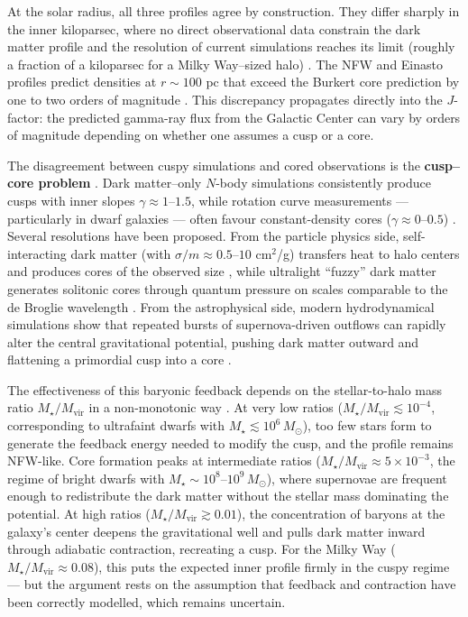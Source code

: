 At the solar radius, all three profiles agree by construction.
They differ sharply in the inner kiloparsec, where no direct observational data constrain the dark matter profile and the resolution of current simulations reaches its limit (roughly a fraction of a kiloparsec for a Milky Way--sized halo) \cite{Cirelli:2024ssz}.
The NFW and Einasto profiles predict densities at $r \sim 100$ pc that exceed the Burkert core prediction by one to two orders of magnitude \cite{Cirelli:2024ssz}.
This discrepancy propagates directly into the $J$-factor: the predicted gamma-ray flux from the Galactic Center can vary by orders of magnitude depending on whether one assumes a cusp or a core.

The disagreement between cuspy simulations and cored observations is the \textbf{cusp--core problem} \cite{Cirelli:2024ssz,Bullock:2017xww}.
Dark matter--only $N$-body simulations consistently produce cusps with inner slopes $\gamma \approx 1$--$1.5$, while rotation curve measurements --- particularly in dwarf galaxies --- often favour constant-density cores ($\gamma \approx 0$--$0.5$) \cite{Bullock:2017xww}.
Several resolutions have been proposed.
From the particle physics side, self-interacting dark matter (with $\sigma/m \approx 0.5$--$10$ cm$^2$/g) transfers heat to halo centers and produces cores of the observed size \cite{Cirelli:2024ssz,Bullock:2017xww}, while ultralight ``fuzzy'' dark matter generates solitonic cores through quantum pressure on scales comparable to the de Broglie wavelength \cite{Cirelli:2024ssz}.
From the astrophysical side, modern hydrodynamical simulations show that repeated bursts of supernova-driven outflows can rapidly alter the central gravitational potential, pushing dark matter outward and flattening a primordial cusp into a core \cite{Cirelli:2024ssz,Bullock:2017xww}.

The effectiveness of this baryonic feedback depends on the stellar-to-halo mass ratio $M_\star / M_\text{vir}$ in a non-monotonic way \cite{Cirelli:2024ssz,Bullock:2017xww}.
At very low ratios ($M_\star / M_\text{vir} \lesssim 10^{-4}$, corresponding to ultrafaint dwarfs with $M_\star \lesssim 10^6\, M_\odot$), too few stars form to generate the feedback energy needed to modify the cusp, and the profile remains NFW-like.
Core formation peaks at intermediate ratios ($M_\star / M_\text{vir} \approx 5 \times 10^{-3}$, the regime of bright dwarfs with $M_\star \sim 10^{8}$--$10^{9}\, M_\odot$), where supernovae are frequent enough to redistribute the dark matter without the stellar mass dominating the potential.
At high ratios ($M_\star / M_\text{vir} \gtrsim 0.01$), the concentration of baryons at the galaxy's center deepens the gravitational well and pulls dark matter inward through adiabatic contraction, recreating a cusp.
For the Milky Way ($M_\star / M_\text{vir} \approx 0.08$), this puts the expected inner profile firmly in the cuspy regime \cite{Cirelli:2024ssz} --- but the argument rests on the assumption that feedback and contraction have been correctly modelled, which remains uncertain.

